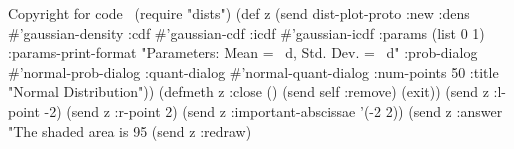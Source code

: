 \nwenddocs{}\endmoddef
\LA{}Copyright for code~{\nwtagstyle{}}\RA{}
(require "dists")
(def z 
  (send dist-plot-proto :new
        :dens #'gaussian-density
        :cdf #'gaussian-cdf
        :icdf #'gaussian-icdf
        :params (list 0 1)
        :params-print-format "Parameters: Mean = ~d, Std. Dev. = ~d"
        :prob-dialog #'normal-prob-dialog
        :quant-dialog #'normal-quant-dialog
        :num-points 50
        :title "Normal Distribution"))
(defmeth z :close () (send self :remove) (exit))
(send z :l-point -2)
(send z :r-point 2)
(send z :important-abscissae '(-2 2))
(send z :answer "The shaded area is 95%
(send z :redraw)
\eatline
